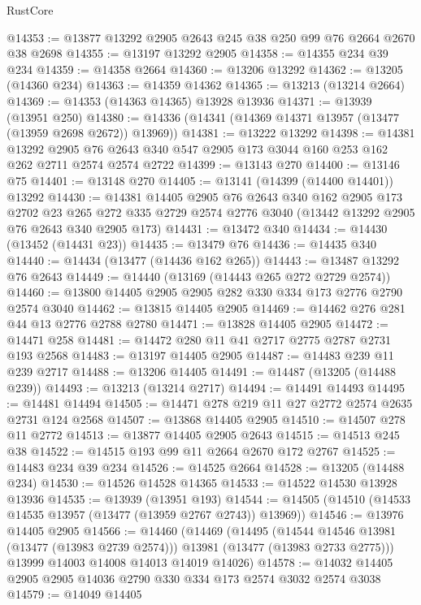 \begin{lexlean}{RustCore}
\begin{coremodule}
@14353 := @13877 @13292 @2905 @2643 @245 @38 @250 @99 @76 @2664 @2670 @38 @2698
@14355 := @13197 @13292 @2905
@14358 := @14355 @234 @39 @234
@14359 := @14358 @2664
@14360 := @13206 @13292
@14362 := @13205 (@14360 @234)
@14363 := @14359 @14362
@14365 := @13213 (@13214 @2664)
@14369 := @14353 (@14363 @14365) @13928 @13936
@14371 := @13939 (@13951 @250)
@14380 := @14336 (@14341 (@14369 @14371 @13957 (@13477 (@13959 @2698 @2672)) @13969))
@14381 := @13222 @13292
@14398 := @14381
    @13292
    @2905
    @76
    @2643
    @340
    @547
    @2905
    @173
    @3044
    @160
    @253
    @162
    @262
    @2711
    @2574
    @2574
    @2722
@14399 := @13143 @270
@14400 := @13146 @75
@14401 := @13148 @270
@14405 := @13141 (@14399 (@14400 @14401)) @13292
@14430 := @14381
    @14405
    @2905
    @76
    @2643
    @340
    @162
    @2905
    @173
    @2702
    @23
    @265
    @272
    @335
    @2729
    @2574
    @2776
    @3040
    (@13442 @13292 @2905 @76 @2643 @340 @2905 @173)
@14431 := @13472 @340
@14434 := @14430 (@13452 (@14431 @23))
@14435 := @13479 @76
@14436 := @14435 @340
@14440 := @14434 (@13477 (@14436 @162 @265))
@14443 := @13487 @13292 @76 @2643
@14449 := @14440 (@13169 (@14443 @265 @272 @2729 @2574))
@14460 := @13800 @14405 @2905 @2905 @282 @330 @334 @173 @2776 @2790 @2574 @3040
@14462 := @13815 @14405 @2905
@14469 := @14462 @276 @281 @44 @13 @2776 @2788 @2780
@14471 := @13828 @14405 @2905
@14472 := @14471 @258
@14481 := @14472 @280 @11 @41 @2717 @2775 @2787 @2731 @193 @2568
@14483 := @13197 @14405 @2905
@14487 := @14483 @239 @11 @239 @2717
@14488 := @13206 @14405
@14491 := @14487 (@13205 (@14488 @239))
@14493 := @13213 (@13214 @2717)
@14494 := @14491 @14493
@14495 := @14481 @14494
@14505 := @14471 @278 @219 @11 @27 @2772 @2574 @2635 @2731 @124 @2568
@14507 := @13868 @14405 @2905
@14510 := @14507 @278 @11 @2772
@14513 := @13877 @14405 @2905 @2643
@14515 := @14513 @245 @38
@14522 := @14515 @193 @99 @11 @2664 @2670 @172 @2767
@14525 := @14483 @234 @39 @234
@14526 := @14525 @2664
@14528 := @13205 (@14488 @234)
@14530 := @14526 @14528 @14365
@14533 := @14522 @14530 @13928 @13936
@14535 := @13939 (@13951 @193)
@14544 := @14505 (@14510 (@14533 @14535 @13957 (@13477 (@13959 @2767 @2743)) @13969))
@14546 := @13976 @14405 @2905
@14566 := @14460
    (@14469
      (@14495
        (@14544 @14546 @13981 (@13477 (@13983 @2739 @2574)))
        @13981
        (@13477 (@13983 @2733 @2775)))
      @13999
      @14003
      @14008
      @14013
      @14019
      @14026)
@14578 := @14032 @14405 @2905 @2905 @14036 @2790 @330 @334 @173 @2574 @3032 @2574 @3038
@14579 := @14049 @14405

\end{coremodule}
\end{lexlean}
